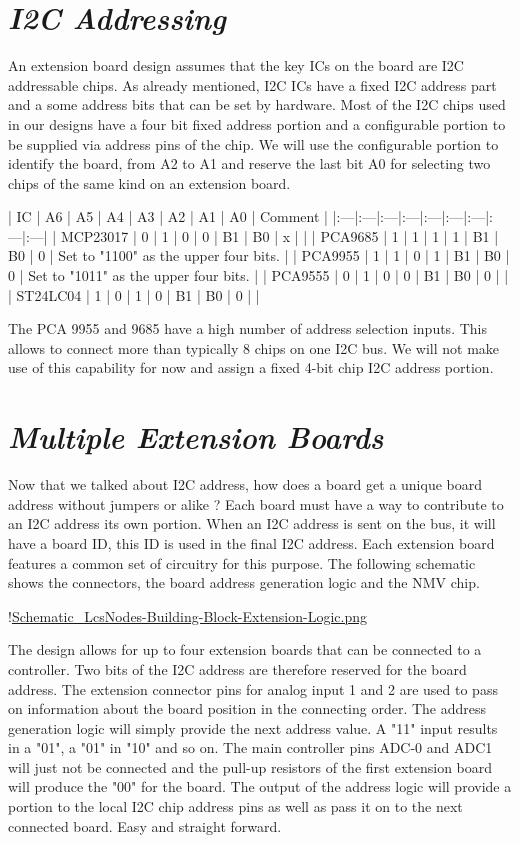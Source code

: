 \section{\textit{I2C Addressing}}

An extension board design assumes that the key ICs on the board are I2C addressable chips. As already mentioned, I2C ICs have a fixed I2C address part and a some address bits that can be set by hardware. Most of the I2C chips used in our designs have a four bit fixed address portion and a configurable portion to be supplied via address pins of the chip. We will use the configurable portion to identify the board, from A2 to A1 and reserve the last bit A0 for selecting two chips of the same kind on an extension board.

| IC | A6 | A5 | A4 | A3 | A2 | A1 | A0 | Comment |
|:---|:---|:---|:---|:---|:---|:---|:---|:---|
| MCP23017 | 0 | 1 | 0 | 0 | B1 | B0 | x | |
| PCA9685  | 1 | 1 | 1 | 1 | B1 | B0 | 0 | Set to "1100" as the upper four bits. |
| PCA9955  | 1 | 1 | 0 | 1 | B1 | B0 | 0 | Set to "1011" as the upper four bits. |
| PCA9555  | 0 | 1 | 0 | 0 | B1 | B0 | 0 | |
| ST24LC04 | 1 | 0 | 1 | 0 | B1 | B0 | 0 | |

The PCA 9955 and 9685 have a high number of address selection inputs. This allows to connect more than typically 8 chips on one I2C bus. We will not make use of this capability for now and assign a fixed 4-bit chip I2C address portion.

\section{\textit{Multiple Extension Boards}}

Now that we talked about I2C address, how does a board get a unique board address without jumpers or alike ? Each board must have a way to contribute to an I2C address its own portion. When an I2C address is sent on the bus, it will have a board ID, this ID is used in the final I2C address. Each extension board features a common set of circuitry for this purpose. The following schematic shows the connectors, the board address generation logic and the NMV chip.

!\href{./Schematics/Schematic_LcsNodes-Building-Block-Extension-Logic.png }{Schematic_LcsNodes-Building-Block-Extension-Logic.png}

The design allows for up to four extension boards that can be connected to a controller. Two bits of the I2C address are therefore reserved for the board address. The extension connector pins for analog input 1 and 2 are used to pass on information about the board position in the connecting order. The address generation logic will simply provide the next address value. A "11" input results in a "01", a "01" in "10" and so on. The main controller pins ADC-0 and ADC1 will just not be connected and the pull-up resistors of the first extension board will produce the "00" for the board. The output of the address logic will provide a portion to the  local I2C chip address pins as well as pass it on to the next connected board. Easy and straight forward.

